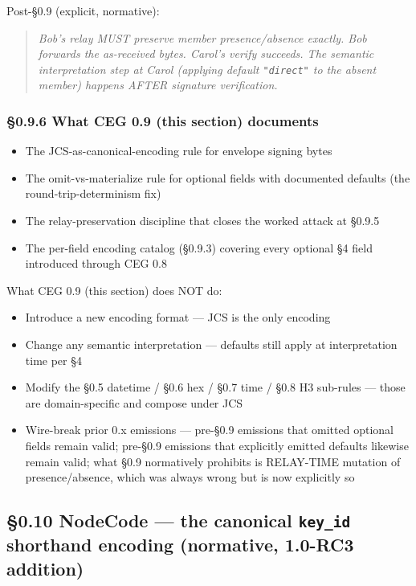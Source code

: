 \documentclass[10pt]{article}
\begin{document}
Post-§0.9 (explicit, normative):


\begin{quote}\itshape Bob's relay MUST preserve member presence/absence exactly. Bob forwards the as-received bytes. Carol's verify succeeds. The semantic interpretation step at Carol (applying default \texttt{"direct"} to the absent member) happens AFTER signature verification.\end{quote}


\subsubsection*{§0.9.6 What CEG 0.9 (this section) documents}


\begin{itemize}\setlength\itemsep{0pt}
\item The JCS-as-canonical-encoding rule for envelope signing bytes
\item The omit-vs-materialize rule for optional fields with documented defaults (the round-trip-determinism fix)
\item The relay-preservation discipline that closes the worked attack at §0.9.5
\item The per-field encoding catalog (§0.9.3) covering every optional §4 field introduced through CEG 0.8
\end{itemize}


What CEG 0.9 (this section) does NOT do:

\begin{itemize}\setlength\itemsep{0pt}
\item Introduce a new encoding format — JCS is the only encoding
\item Change any semantic interpretation — defaults still apply at interpretation time per §4
\item Modify the §0.5 datetime / §0.6 hex / §0.7 time / §0.8 H3 sub-rules — those are domain-specific and compose under JCS
\item Wire-break prior 0.x emissions — pre-§0.9 emissions that omitted optional fields remain valid; pre-§0.9 emissions that explicitly emitted defaults likewise remain valid; what §0.9 normatively prohibits is RELAY-TIME mutation of presence/absence, which was always wrong but is now explicitly so
\end{itemize}


\subsection*{§0.10 NodeCode — the canonical \texttt{key\_id} shorthand encoding (normative, 1.0-RC3 addition)}
\end{document}
